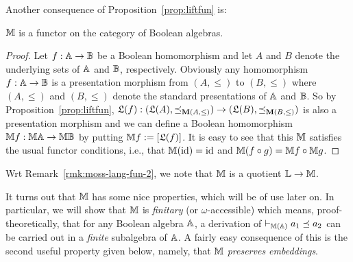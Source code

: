\documentclass{book}
\begin{document}
Another consequence of Proposition~\ref{prop:liftfun} is:

\begin{proposition}
\label{p:1}
$\mathbb{M}$ is a functor on the category of Boolean algebras. 
\end{proposition}
\xxviproofspace
\begin{proof}
Let $f:\mathbb{A}\to \mathbb{B}$ be a Boolean homomorphism and let $A$ and $B$
denote the
underlying sets of $\mathbb{A}$ and $\mathbb{B}$, respectively.
Obviously any homomorphism 
$f:\mathbb{A} \to \mathbb{B}$ is a presentation morphism from
$(A,\leq)$ to $(B,\leq)$ where $(A,\leq)$ and $(B,\leq)$ denote the standard
presentations of $\mathbb{A}$ and $\mathbb{B}$. 
So by Proposition~\ref{prop:liftfun}, 
$\mathfrak{L}(f): (\mathfrak{L}(A),\preceq_{\mathbf{M}(A,\leq)}) \to
(\mathfrak{L}(B),\preceq_{\mathbf{M}(B,\leq)})$ is also a presentation morphism and we can
define a Boolean homomorphism $\mathbb{M} f: \mathbb{M} \mathbb{A} \to \mathbb{M} \mathbb{B}$ by putting
$\mathbb{M} f \mathrel{:=} [\mathfrak{L}(f)]$.
It is easy to see that this $\mathbb{M}$ satisfies the usual functor conditions,
i.e., that $\mathbb{M} ({\mathrm{id}}) = {\mathrm{id}}$ and $\mathbb{M}(f \circ g) = \mathbb{M} f \circ \mathbb{M} g$.
% 
%
%
\end{proof}

\begin{remark}\label{rmk:L-M}
  Wrt Remark~\ref{rmk:moss-lang-fun-2}, we note that $\mathbb{M}$ is
  a quotient ${\mathbb{L}}\to\mathbb{M}$.
\end{remark}

It turns out that $\mathbb{M}$ has some nice properties, which will be of use
later on.  In particular, we will show that $\mathbb{M}$ is \emph{finitary}
(or $\omega$-accessible) which means, proof-theoretically, that for any
Boolean algebra $\mathbb{A}$, a derivation of $\vdash_{\mathbb{M}(\mathbb{A})}a_{1}\preceq
a_{2}$ can be carried out in a \emph{finite} subalgebra of $\mathbb{A}$.  A
fairly easy consequence of this is the second useful property given
below, namely, that $\mathbb{M}$ \emph{preserves embeddings}.
\end{document}
